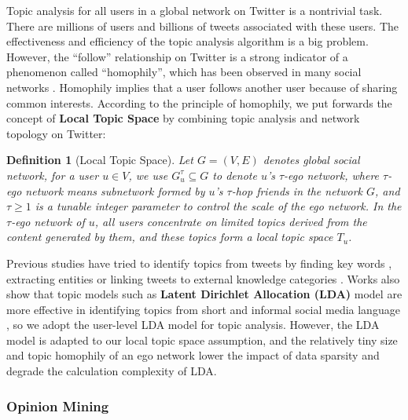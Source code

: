 \documentclass[letterpaper]{article}
\newtheorem{definition}{Definition}
\begin{document}
Topic analysis for all users in a global network on Twitter is a nontrivial task. 
There are millions of users and billions of tweets associated with these users. The effectiveness and efficiency of the topic analysis algorithm is a big problem.
However, the ``follow'' relationship on Twitter is a strong indicator of a phenomenon called ``homophily'', which has been observed in many social networks \cite{mcpherson2001birds}.
Homophily implies that a user follows another user because of sharing common interests. 
According to the principle of homophily, we put forwards the concept of \textbf{Local Topic Space} by combining topic analysis and network topology on Twitter: 
\begin{definition}[Local Topic Space]
\label{local}
Let $G=\left( V,E \right) $ denotes global social network, for a user $ u \in V $, we use $ G_{u}^{\tau} \subseteq G$ 
to denote $ u $'s $ \tau $-ego network, where $ \tau $-ego network means subnetwork formed by $ u $'s $ \tau $-hop 
friends in the network $ G $, and $ \tau \geqslant 1 $ is a tunable integer parameter to control the scale of the ego network. 
In the $ \tau $-ego network of $ u $, all users concentrate on limited topics derived from the content generated by them, and these topics form a local topic space $ T_{u} $.
\end{definition}

Previous studies have tried to identify topics from tweets by finding key words \cite{chen2010short}, extracting  entities \cite{abel2011analyzing} or linking tweets to external knowledge categories \cite{macskassy2011people}. Works also show that topic models such as \textbf{Latent Dirichlet Allocation (LDA)} model \cite{blei2003latent} are more effective in identifying topics from short and informal social media language \cite{hong2010empirical}, so we adopt the user-level LDA model for topic analysis. 
However, the LDA model is adapted to our local topic space assumption, and the relatively tiny size and topic homophily of an ego network lower the impact of data sparsity and degrade the calculation complexity of LDA.
 
\subsubsection{Opinion Mining}
\label{opinion}
\end{document}
